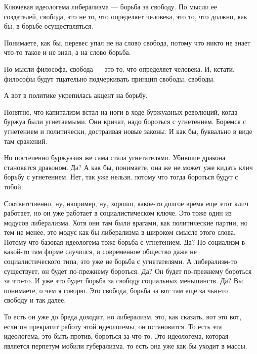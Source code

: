 Ключевая идеологема либерализма — борьба за свободу. По мысли ее
создателей, свобода, это не то, что определяет человека, это то, что должно, как
бы, в борьбе осуществляться. 

Понимаете, как бы, перевес упал не на слово
свобода, потому что никто не знает что-то такое и не знал, а на слово борьба. 

По
мысли философа, свобода — это то, что определяет человека. И,
кстати, философы будут тщательно подчеркивать принцип свободы, свободы. 

А вот в
политике укрепилась акцент на борьбу. 


Понятно, что капитализм встал на ноги в ходе
буржуазных революций, когда буржуа были угнетаемыми. Они кричат, надо бороться с
угнетением. Боремся с угнетением и политически, достраивая новые законы. И как
бы, буквально в виде там сражений.

Но постепенно буржуазия же сама стала
угнетателями. Убившие дракона становятся драконом. Да? А как бы, понимаете, она
же не может уже кидать клич борьбу с угнетением. Нет, так уже нельзя, потому что
тогда бороться будут с тобой. 

Соответственно, ну, например, ну, хорошо, какое-то
долгое время еще этот клич работает, но он уже работает в социалистическом
ключе. Это тоже один из модусов либерализма. Хотя они там были врагами, как
политические партии, но тем не менее, это модус как бы либерализма в широком
смысле этого слова. Потому что базовая идеологема тоже борьба с угнетением. Да?
Но социализм в какой-то там форме случился, и современное общество даже не
социалистического типа, это уже не борьба с угнетателями. А либерализм-то
существует, он будет по-прежнему бороться. Да? Он будет по-прежнему бороться за
что-то. И уже это будет борьба за свободу социальных меньшинств. Да? Вы
понимаете, о чем я говорю. Это свобода, борьба за вот там еще за чью-то свободу
и так далее. 

То есть он уже до бреда доходит, но либерализм, это, как сказать,
вот это вот, если он прекратит работу этой идеологемы, он остановится. То есть
эта идеологема, это быть против, бороться за что-то. Это идеологема, которая
является перпетум мобили губерализма. то есть она уже как бы уходит в массы.

